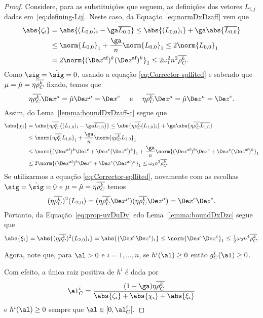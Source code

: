 \begin{proof}
Considere, para as substituições que seguem, as definições dos vetores $L_{i,j}$ dadas em~\eqref{eq:defining-Lij}. Neste caso, da Equação~\eqref{eq:normDxDzaff}  vem que  
\begin{align}
\abs{\zeta_i} & = \abs{(L_{0,0})_i - \ga \dbvec{L_{0,0}}} \leq \abs{(L_{0,0})_i} + \ga \abs{\dbvec{L_{0,0}}} \notag \\
			  & \leq	\norm{L_{0,0}}_1  + \dfrac{\ga}{n}\norm{L_{0,0}}_1   \leq 2\norm{L_{0,0}}_1 \notag \\
			  & = 2\norm{ \dekx  \dekz }_1   \leq 2\omega_1^{2} n^{2}\rhoCkb . \label{eq:bound-zeta-i}
\end{align}
Como $\sig = \nextsig=0$, usando a equação \eqref{eq:Corrector-spllited} e sabendo que $\mu=\hat{\mu} = \eta\overline{\rho_C^{k}}$ fixado, temos que 
	\[
		\eta\rhoCkb \Dex^\mu =  \nextmu\Dex^\mu = \Decox   \quad \text{ e } \quad \eta\rhoCkb \Dez^\mu=  \nextmu\Dez^\mu=  \Decoz .
	\]
	Assim, do Lema~\ref{lemma:boundDxDzaff-c} segue que
\begin{align}
	\abs{\chi_i }  	& = \abs{\eta\rhoCkb  \left( ({L_{1,0}})_i - \ga\dbvec{L_{1,0}} \right)} \leq \abs{\eta\rhoCkb   ({L_{1,0}})_i} + \ga\abs { \eta\rhoCkb \dbvec{L_{1,0}}} 
					\notag \\
					&\leq \norm{\eta\rhoCkb   L_{1,0}}_1 + \dfrac{\ga}{n}\norm{\eta\rhoCkb   L_{1,0}}_1 \notag\\
					& \leq \norm{ \dekx \Decoz + \Decox \dekz }_1 + \dfrac{\ga}{n}\norm{ \dekx \Decoz + \Decox \dekz }_1 \notag\\
					& \leq 2 \norm{ \dekx \Decoz + \Decox \dekz }_1  \leq \omega_{3}n^{3}\rhoCkb . \label{eq:bound-chi-i}
\end{align}
Se utilizarmos  a equação \eqref{eq:Corrector-spllited}, novamente com as escolhas $\sig = \nextsig=0$ e $\mu=\hat{\mu} = \eta\overline{\rho_C^{k}} $ temos
\[
	(\eta\rhoCkb )^2(L_{2,0}) = (\eta\rhoCkb \Dex^\mu)(\eta\rhoCkb \Dez^\mu) = \Decox\Decoz.
\]
Portanto, da Equação~\ref{eq:prop-uvDuDv} edo Lema~\ref{lemma:boundDxDzc} segue que
\begin{equation}\label{eq:bound-xi-i}
	\abs{\xi_i}	 =  \abs{(\eta\rhoCkb )^2(L_{2,0})_i}  = \abs{(\Decox\Decoz)_i} \leq \norm{\Decox\Decoz}_1 \leq \tfrac{1}{2} \omega_2 n^{4}\rhoCkb .
\end{equation}
	


Agora, note que, para $\al>0$ e $i=1,\ldots,n$, se $h^i(\al)\geq0$ então $g_C^i(\al)\geq 0$. 

Com efeito, a única raiz positiva de $h^i$ é dada por
\[
\al_{C}^i = \dfrac{(1-\ga)\eta\rhoCkb }{\abs{\zeta_i} + \abs{\chi_i} + \abs{\xi_i}}
\]
e $h^i(\al)\geq 0$ sempre que $\al\in[0,\al_{C}^i].$ 


\end{proof}
